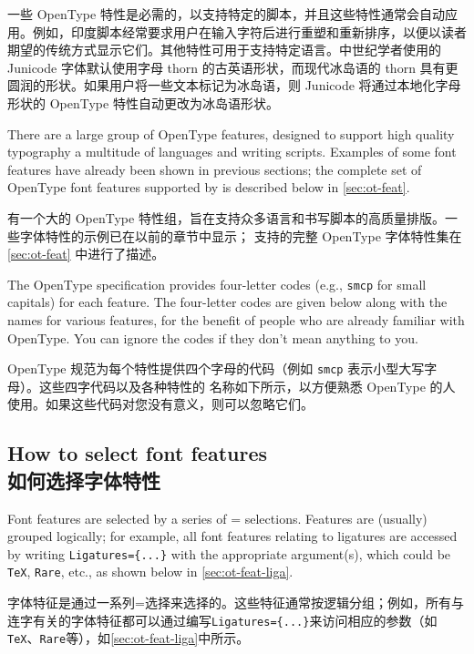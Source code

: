\documentclass[a4paper]{l3doc}
\begin{document}
一些 OpenType 特性是必需的，以支持特定的脚本，并且这些特性通常会自动应用。例如，印度脚本经常要求用户在输入字符后进行重塑和重新排序，以便以读者期望的传统方式显示它们。其他特性可用于支持特定语言。中世纪学者使用的 Junicode 字体默认使用字母 thorn 的古英语形状，而现代冰岛语的 thorn 具有更圆润的形状。如果用户将一些文本标记为冰岛语，则 Junicode 将通过本地化字母形状的 OpenType 特性自动更改为冰岛语形状。

There are a large group of OpenType features, designed to support high quality typography a multitude of languages and writing scripts.
Examples of some font features have already been shown in previous sections; the complete set of OpenType font features supported by  is described below in \ref{sec:ot-feat}.

有一个大的 OpenType 特性组，旨在支持众多语言和书写脚本的高质量排版。一些字体特性的示例已在以前的章节中显示；  支持的完整 OpenType 字体特性集在 \ref{sec:ot-feat} 中进行了描述。

The OpenType specification provides four-letter codes (e.g., \texttt{smcp} for small capitals) for each feature.  The four-letter codes are given below along with the  names for various features, for the benefit of people who are already familiar with OpenType.  You can ignore the codes if they don't mean anything to you.

OpenType 规范为每个特性提供四个字母的代码（例如 \texttt{smcp} 表示小型大写字母）。这些四字代码以及各种特性的  名称如下所示，以方便熟悉 OpenType 的人使用。如果这些代码对您没有意义，则可以忽略它们。

\subsection{How to select font features\\如何选择字体特性}

Font features are selected by a series of =
selections. Features are (usually) grouped logically; for example, all
font features relating to ligatures are accessed by writing \verb|Ligatures={...}| with the appropriate argument(s), which could be \texttt{TeX}, \texttt{Rare}, etc., as shown below in \ref{sec:ot-feat-liga}.

字体特征是通过一系列=选择来选择的。这些特征通常按逻辑分组；例如，所有与连字有关的字体特征都可以通过编写\verb|Ligatures={...}|来访问相应的参数（如\texttt{TeX}、\texttt{Rare}等），如\ref{sec:ot-feat-liga}中所示。
\end{document}

